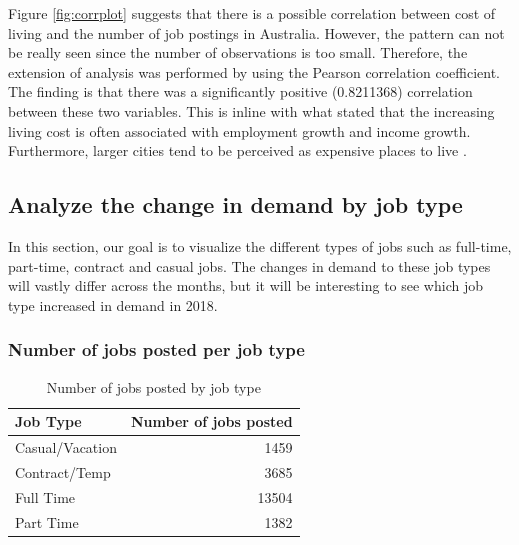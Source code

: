 \documentclass[11pt,a4paper,]{article}
\begin{document}
Figure \ref{fig:corrplot} suggests that there is a possible correlation between cost of living and the number of job postings in Australia. However, the pattern can not be really seen since the number of observations is too small. Therefore, the extension of analysis was performed by using the Pearson correlation coefficient. The finding is that there was a significantly positive (0.8211368) correlation between these two variables. This is inline with what \textcite{DePietro} stated that the increasing living cost is often associated with employment growth and income growth. Furthermore, larger cities tend to be perceived as expensive places to live \autocite{Weinstein}.

\hypertarget{analyze-the-change-in-demand-by-job-type}{%
\subsection{Analyze the change in demand by job type}\label{analyze-the-change-in-demand-by-job-type}}

In this section, our goal is to visualize the different types of jobs such as full-time, part-time, contract and casual jobs. The changes in demand to these job types will vastly differ across the months, but it will be interesting to see which job type increased in demand in 2018.

\hypertarget{number-of-jobs-posted-per-job-type}{%
\subsubsection{Number of jobs posted per job type}\label{number-of-jobs-posted-per-job-type}}

\begin{table}

\caption{\label{tab:job-type-counts}Number of jobs posted by job type}
\centering
\begin{tabular}[t]{l|r}
\hline
Job Type & Number of jobs posted\\
\hline
Casual/Vacation & 1459\\
\hline
Contract/Temp & 3685\\
\hline
Full Time & 13504\\
\hline
Part Time & 1382\\
\hline
\end{tabular}
\end{table}
\end{document}
